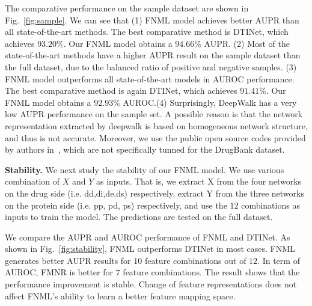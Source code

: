 \documentclass[sigconf,anonymous]{acmart}
\begin{document}
The comparative performance on the sample dataset are shown in Fig.~\ref{fig:sample}. We can see that (1) FNML model achieves better AUPR than all state-of-the-art methods. The best comparative method is DTINet, which achieves $93.20\%$. Our FNML model obtains a $94.66\%$ AUPR. (2) Most of the state-of-the-art methods have a higher AUPR result on the sample dataset than the full dataset, due to the balanced ratio of positive and negative samples. (3) FNML model outperforms all state-of-the-art models in AUROC performance.  The best comparative method is again DTINet, which achieves $91.41\%$. Our FNML model obtains a $92.93\%$ AUROC.(4) Surprisingly, DeepWalk has a very low AUPR performance on the sample set. A possible reason is that the network representation extracted by deepwalk is based on homogeneous network structure, and thus is not accurate. Moreover, we use the public open source codes provided by authors in~\cite{Zong2017Deep}, which are not specifically tunned for the DrugBank dataset.

\textbf{Stability.} We next study the stability of our FNML model. We use various combination of $X$ and $Y$ as inputs. That is, we extract X from the four networks on the drug side (i.e. dd,di,de,ds) respectively, extract Y from the three networks on the protein side (i.e. pp, pd, ps) respectively, and use the $12$ combinations as inputs to train the model. The predictions are tested on the full dataset.

We compare the AUPR and AUROC performance of FNML and DTINet. As shown in Fig.~\ref{fig:stability}, FNML outperforms DTINet in most cases. FNML generates better AUPR results for $10$ feature combinations out of $12$. In term of AUROC, FMNR is better for $7$ feature combinations. The result shows that the performance improvement is stable. Change of feature representations does not affect FNML's ability to learn a better feature mapping space.
\end{document}
